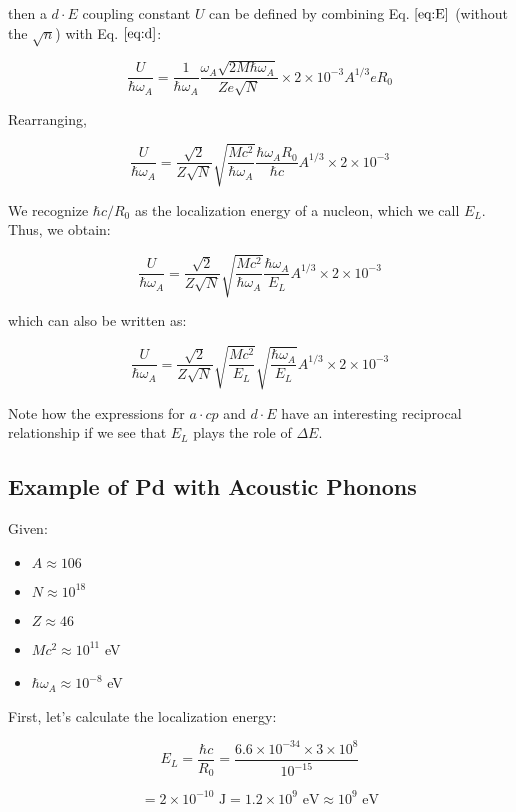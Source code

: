 \documentclass[
]{article}
\renewcommand{\[}{\begin{equation}}
\renewcommand{\]}{\end{equation}}
\providecommand{\tightlist}{%
  \setlength{\itemsep}{0pt}\setlength{\parskip}{0pt}}
\begin{document}
then a \(d \cdot E\) coupling constant \(U\) can be defined by combining
Eq. \(\ref{eq:E}\) (without the \(\sqrt{n}\)) with Eq. \(\ref{eq:d}\):

\[
\frac{U}{\hbar \omega_A} = \frac{1}{\hbar \omega_A} \frac{\omega_A \sqrt{2M \hbar \omega_A}}{Ze \sqrt{N}} \times 2 \times 10^{-3} A^{1/3} e R_0
\]

Rearranging,

\[
\frac{U}{\hbar \omega_A} = \frac{\sqrt{2}}{Z \sqrt{N}} \sqrt{\frac{M c^2}{\hbar \omega_A}} \frac{\hbar \omega_A R_0}{\hbar c} A^{1/3} \times 2 \times 10^{-3}
\]

We recognize \(\hbar c / R_0\) as the localization energy of a nucleon,
which we call \(E_L\). Thus, we obtain:

\[
\frac{U}{\hbar \omega_A} = \frac{\sqrt{2}}{Z \sqrt{N}} \sqrt{\frac{M c^2}{\hbar \omega_A}} \frac{\hbar \omega_A}{E_L} A^{1/3} \times 2 \times 10^{-3}
\]

which can also be written as:

\[
\frac{U}{\hbar \omega_A} = \frac{\sqrt{2}}{Z \sqrt{N}} \sqrt{\frac{M c^2}{E_L}} \sqrt{\frac{\hbar \omega_A}{E_L}} A^{1/3} \times 2 \times 10^{-3}
\]

Note how the expressions for \(a \cdot cp\) and \(d \cdot E\) have an
interesting reciprocal relationship if we see that \(E_L\) plays the
role of \(\Delta E\).

\subsection{Example of Pd with Acoustic
Phonons}\label{example-of-pd-with-acoustic-phonons}

Given:

\begin{itemize}
\tightlist
\item
  \(A \approx 106\)
\item
  \(N \approx 10^{18}\)
\item
  \(Z \approx 46\)
\item
  \(M c^2 \approx 10^{11}\) eV
\item
  \(\hbar \omega_A \approx 10^{-8}\) eV
\end{itemize}

First, let's calculate the localization energy:

\[
E_L = \frac{\hbar c}{R_0} = \frac{6.6 \times 10^{-34} \times 3 \times 10^8}{10^{-15}}
\]

\[
= 2 \times 10^{-10} \text{ J} = 1.2 \times 10^9 \text{ eV} \approx 10^9 \text{ eV}
\]
\end{document}
